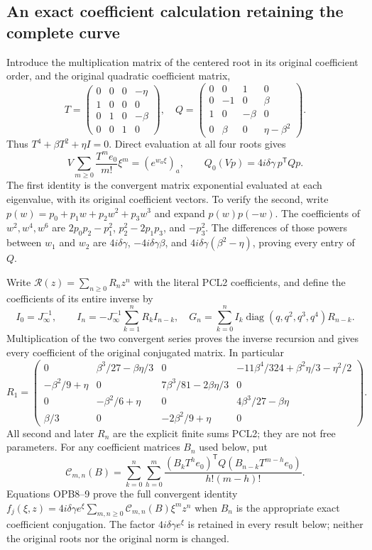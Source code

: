 \documentclass[11pt]{article}
\begin{document}
\subsection{An exact coefficient calculation retaining the complete curve}
Introduce the multiplication matrix of the centered root in its original
coefficient order, and the original quadratic coefficient matrix,
\[
 T=\begin{pmatrix}0&0&0&-\eta\\1&0&0&0\\0&1&0&-\beta\\0&0&1&0\end{pmatrix},
 \quad
 Q=\begin{pmatrix}0&0&1&0\\0&-1&0&\beta\\1&0&-\beta&0\\
                    0&\beta&0&\eta-\beta^2\end{pmatrix}.
 \tag{OPB7}
\]
Thus $T^4+\beta T^2+\eta I=0$. Direct evaluation at all four roots gives
\[
 V\sum_{m\ge0}\frac{T^me_0}{m!}\xi^m=(e^{w_a\xi})_a,
 \qquad Q_0(Vp)=4i\delta\gamma\,p^{\mathsf T}Qp.
 \tag{OPB8}
\]
The first identity is the convergent matrix exponential evaluated at
each eigenvalue, with its original coefficient vectors. To verify the
second, write $p(w)=p_0+p_1w+p_2w^2+p_3w^3$ and expand
$p(w)p(-w)$. The coefficients of $w^2,w^4,w^6$ are
$2p_0p_2-p_1^2$, $p_2^2-2p_1p_3$, and $-p_3^2$.
The differences of those powers between $w_1$ and $w_2$ are
$4i\delta\gamma$, $-4i\delta\gamma\beta$, and
$4i\delta\gamma(\beta^2-\eta)$, proving every entry of $Q$.

Write $\mathcal R(z)=\sum_{n\ge0}R_nz^n$ with the literal PCL2
coefficients, and define the coefficients of its entire inverse by
\[
 I_0=J_\infty^{-1},\qquad
 I_n=-J_\infty^{-1}\sum_{k=1}^nR_k I_{n-k},\quad
 G_n=\sum_{k=0}^n I_k\operatorname{diag}(q,q^2,q^3,q^4)R_{n-k}.
 \tag{OPB9}
\]
Multiplication of the two convergent series proves the inverse recursion
and gives every coefficient of the original conjugated matrix.
In particular
\[
 R_1=\begin{pmatrix}
 0&\beta^3/27-\beta\eta/3&0&-11\beta^4/324+\beta^2\eta/3-\eta^2/2\\
 -\beta^2/9+\eta&0&7\beta^3/81-2\beta\eta/3&0\\
 0&-\beta^2/6+\eta&0&4\beta^3/27-\beta\eta\\
 \beta/3&0&-2\beta^2/9+\eta&0
 \end{pmatrix}.
 \tag{OPB10}
\]
All second and later $R_n$ are the explicit finite sums PCL2; they are
not free parameters. For any coefficient matrices $B_n$ used below, put
\[
 \mathcal C_{m,n}(B)=
 \sum_{k=0}^n\sum_{h=0}^m
 \frac{(B_k T^he_0)^{\mathsf T}Q(B_{n-k}T^{m-h}e_0)}{h!(m-h)!}.
 \tag{OPB11}
\]
Equations OPB8--9 prove the full convergent identity
$f_j(\xi,z)=4i\delta\gamma e^\xi
\sum_{m,n\ge0}\mathcal C_{m,n}(B)\xi^mz^n$
when $B_n$ is the appropriate exact coefficient conjugation.
The factor $4i\delta\gamma e^\xi$ is retained in every result below;
neither the original roots nor the original norm is changed.
\end{document}
